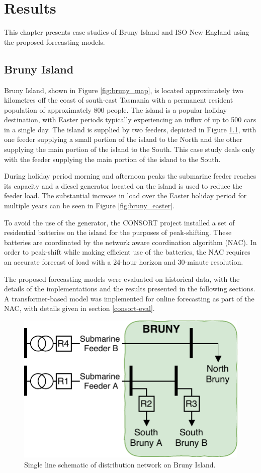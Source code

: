 \chapter{Results}
This chapter presents case studies of Bruny Island and ISO New England using the proposed forecasting models.

\section{Bruny Island}
Bruny Island, shown in Figure \ref{fig:bruny_map}, is located approximately two kilometres off the coast of south-east Tasmania with a permanent resident population of approximately 800 people.
The island is a popular holiday destination, with Easter periods typically experiencing an influx of up to 500 cars in a single day.
The island is supplied by two feeders, depicted in Figure \ref{fig:bruny_network}, with  one feeder supplying a small portion of the island to the North and the other supplying the main portion of the island to the South.
This case study deals only with the feeder supplying the main portion of the island to the South.

During holiday period morning and afternoon peaks the submarine feeder reaches its capacity and a diesel generator located on the island is used to reduce the feeder load.
The substantial increase in load over the Easter holiday period for multiple years can be seen in Figure \ref{fig:bruny_easter}.

To avoid the use of the generator, the CONSORT project installed a set of residential batteries on the island for the purposes of peak-shifting.
These batteries are coordinated by the network aware coordination algorithm (NAC).
In order to peak-shift while making efficient use of the batteries, the NAC requires an accurate forecast of load with a 24-hour horizon and 30-minute resolution.

The proposed forecasting models were evaluated on historical data, with the details of the implementations and the results presented in the following sections.
A transformer-based model was implemented for online forecasting as part of the NAC, with details given in section \ref{consort-eval}.

\begin{figure}[htbp]
	\centerline{\includegraphics[width=.45\textwidth]{images/bruny_single_line.pdf}}
	\caption{Single line schematic of distribution network on Bruny Island.}
	\label{fig:bruny_network}
\end{figure}

